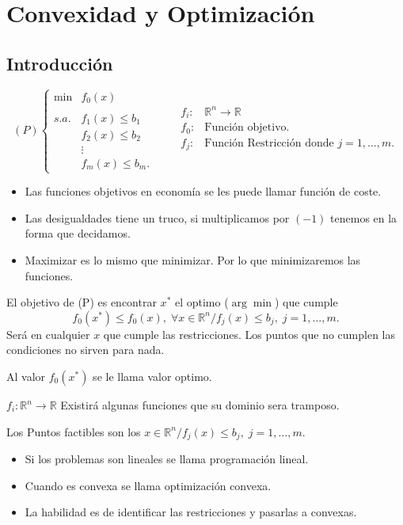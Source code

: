 \chapter{Convexidad y Optimización}

\section{Introducción}

$$
(P)
\left\{
\begin{array}{rl}
    \min & f_0(x)\\\\
    s.a. & f_1(x) \leq b_1\\
	 &f_2(x) \leq b_2\\
	 & \vdots\\
	 & f_m(x) \leq b_m.
\end{array}
\right.
\qquad
\begin{array}{rl}
    f_i: & \mathbb{R}^n \rightarrow \mathbb{R}\\
    f_0 : & \mbox{Función objetivo.}\\
    f_j : & \mbox{Función Restricción donde }j=1,\ldots,m.\\
\end{array}
$$
\begin{itemize}
    \item Las funciones objetivos en economía se les puede llamar función de coste.
    \item Las desigualdades tiene un truco, si multiplicamos por $(-1)$ tenemos en la forma que decidamos.
    \item Maximizar es lo mismo que minimizar. Por lo que minimizaremos las funciones. 
\end{itemize}

El objetivo de (P) es encontrar $x^*$ el optimo ($\arg\min$) que cumple 
$$f_0(x^*)\leq f_0(x), \;\forall x\in \mathbb{R}^n / f_j(x)\leq b_j,\; j=1,\ldots,m.$$
Será en cualquier $x$ que cumple las restricciones. Los puntos que no cumplen las condiciones no sirven para nada.

Al valor $f_0(x^*)$ se le llama valor optimo.

$f_i:  \mathbb{R}^n \rightarrow \mathbb{R}$ Existirá algunas funciones que su dominio sera tramposo.

Los Puntos factibles son los $x\in \mathbb{R}^n / f_j(x)\leq b_j,\; j=1,\ldots,m.$

\begin{itemize}
    \item  Si los problemas son lineales se llama programación lineal.
    \item Cuando es convexa se llama optimización convexa.
    \item La habilidad es de identificar las restricciones y pasarlas a convexas.
\end{itemize}

